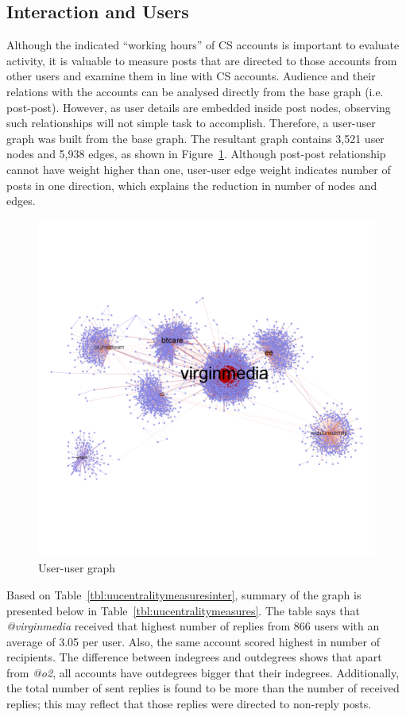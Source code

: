 \documentclass[sigconf]{acmart}
\begin{document}
\subsection{Interaction and Users}

Although the indicated ``working hours'' of CS accounts is important
to evaluate activity, it is valuable to measure posts that are
directed to those accounts from other users and examine them in line
with CS accounts. Audience and their relations with the accounts can
be analysed directly from the base graph (i.e. post-post). However, as
user details are embedded inside post nodes, observing such
relationships will not simple task to accomplish. Therefore, a
user-user graph was built from the base graph. The resultant graph
contains 3,521 user nodes and 5,938 edges, as shown in
Figure~\ref{fig:userusergraph}. Although post-post relationship cannot
have weight higher than one, user-user edge weight indicates number of
posts in one direction, which explains the reduction in number of
nodes and edges.

\begin{figure}[htb]
\centering
\includegraphics[width=\columnwidth]{images/userusergraph.png}
\caption{User-user graph}
\label{fig:userusergraph}
\end{figure}

Based on Table~\ref{tbl:uucentralitymeasuresinter}, summary of the
graph is presented below in Table~\ref{tbl:uucentralitymeasures}. The
table says that {\emph{@virginmedia}} received that highest number of
replies from 866 users with an average of 3.05 per user. Also, the
same account scored highest in number of recipients. The difference
between indegrees and outdegrees shows that apart from {\emph{@o2}},
all accounts have outdegrees bigger that their
indegrees. Additionally, the total number of sent replies is found to
be more than the number of received replies; this may reflect that
those replies were directed to non-reply posts.
\end{document}
